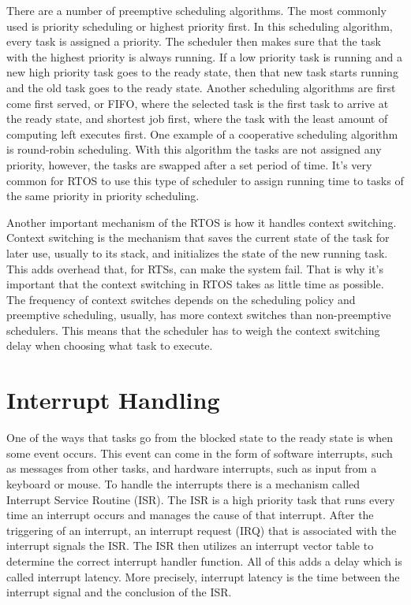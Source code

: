 There are a number of preemptive scheduling algorithms. The most commonly used is priority scheduling or highest priority first. In this scheduling algorithm, every task is assigned a priority. The scheduler then makes sure that the task with the highest priority is always running. If a low priority task is running and a new high priority task goes to the ready state, then that new task starts running and the old task goes to the ready state. Another scheduling algorithms are first come first served, or FIFO, where the selected task is the first task to arrive at the ready state, and shortest job first, where the task with the least amount of computing left executes first. One example of a cooperative scheduling algorithm is round-robin scheduling. With this algorithm the tasks are not assigned any priority, however, the tasks are swapped after a set period of time. It's very common for RTOS to use this type of scheduler to assign running time to tasks of the same priority in priority scheduling.

Another important mechanism of the RTOS is how it handles context switching. Context switching is the mechanism that saves the current state of the task for later use, usually to its stack, and initializes the state of the new running task. This adds overhead that, for RTSs, can make the system fail. That is why it's important that the context switching in RTOS takes as little time as possible. The frequency of context switches depends on the scheduling policy and preemptive scheduling, usually, has more context switches than non-preemptive schedulers. This means that the scheduler has to weigh the context switching delay when choosing what task to execute.




\section{Interrupt Handling}
One of the ways that tasks go from the blocked state to the ready state is when some event occurs. This event can come in the form of software interrupts, such as messages from other tasks, and hardware interrupts, such as input from a keyboard or mouse. To handle the interrupts there is a mechanism called Interrupt Service Routine (ISR). The ISR is a high priority task that runs every time an interrupt occurs and manages the cause of that interrupt. After the triggering of an interrupt, an interrupt request (IRQ) that is associated with the interrupt signals the ISR. The ISR then utilizes an interrupt vector table to determine the correct interrupt handler function. All of this adds a delay which is called interrupt latency. More precisely, interrupt latency is the time between the interrupt signal and the conclusion of the ISR.

